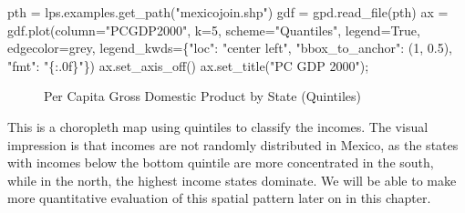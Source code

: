 \documentclass[
  a4paper, 
  twoside,
  final
]{article}
\newenvironment{Shaded}{\begin{snugshade}}{\end{snugshade}}
\newcommand{\DecValTok}[1]{\textcolor[rgb]{0.68,0.00,0.00}{#1}}
\newcommand{\FloatTok}[1]{\textcolor[rgb]{0.68,0.00,0.00}{#1}}
\newcommand{\NormalTok}[1]{\textcolor[rgb]{0.00,0.23,0.31}{#1}}
\newcommand{\OperatorTok}[1]{\textcolor[rgb]{0.37,0.37,0.37}{#1}}
\newcommand{\SpecialCharTok}[1]{\textcolor[rgb]{0.37,0.37,0.37}{#1}}
\newcommand{\StringTok}[1]{\textcolor[rgb]{0.13,0.47,0.30}{#1}}
\newcommand{\VariableTok}[1]{\textcolor[rgb]{0.07,0.07,0.07}{#1}}
\begin{document}
\begin{Shaded}
\begin{Highlighting}[]
\NormalTok{pth }\OperatorTok{=}\NormalTok{ lps.examples.get\_path(}\StringTok{"mexicojoin.shp"}\NormalTok{)}
\NormalTok{gdf }\OperatorTok{=}\NormalTok{ gpd.read\_file(pth)}
\NormalTok{ax }\OperatorTok{=}\NormalTok{ gdf.plot(column}\OperatorTok{=}\StringTok{"PCGDP2000"}\NormalTok{, k}\OperatorTok{=}\DecValTok{5}\NormalTok{, scheme}\OperatorTok{=}\StringTok{"Quantiles"}\NormalTok{,}
\NormalTok{              legend}\OperatorTok{=}\VariableTok{True}\NormalTok{,}
\NormalTok{              edgecolor}\OperatorTok{=}\StringTok{\textquotesingle{}grey\textquotesingle{}}\NormalTok{,}
\NormalTok{              legend\_kwds}\OperatorTok{=}\NormalTok{\{}\StringTok{"loc"}\NormalTok{: }\StringTok{"center left"}\NormalTok{,}
                           \StringTok{"bbox\_to\_anchor"}\NormalTok{: (}\DecValTok{1}\NormalTok{, }\FloatTok{0.5}\NormalTok{),}
                           \StringTok{"fmt"}\NormalTok{: }\StringTok{"}\SpecialCharTok{\{:.0f\}}\StringTok{"}\NormalTok{\})}
\NormalTok{ax.set\_axis\_off()}
\NormalTok{ax.set\_title(}\StringTok{"PC GDP 2000"}\NormalTok{)}\OperatorTok{;}
\end{Highlighting}
\end{Shaded}

\begin{figure}[H]


\caption{\label{fig-mappcgdp2000}Per Capita Gross Domestic Product by
State (Quintiles)}

\end{figure}%

This is a choropleth map using quintiles to classify the incomes. The
visual impression is that incomes are not randomly distributed in
Mexico, as the states with incomes below the bottom quintile are more
concentrated in the south, while in the north, the highest income states
dominate. We will be able to make more quantitative evaluation of this
spatial pattern later on in this chapter.
\end{document}

